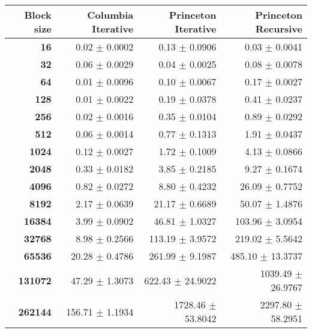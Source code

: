 \begin{tabular}{rrrr}\toprule
\textbf{Block size}  & \textbf{Columbia Iterative} & \textbf{Princeton Iterative} & \textbf{Princeton Recursive}\\\midrule
\textbf{16}  & 0.02 $\pm$ 0.0002 & 0.13 $\pm$ 0.0906 & 0.03 $\pm$ 0.0041\\
\textbf{32}  & 0.06 $\pm$ 0.0029 & 0.04 $\pm$ 0.0025 & 0.08 $\pm$ 0.0078\\
\textbf{64}  & 0.01 $\pm$ 0.0096 & 0.10 $\pm$ 0.0067 & 0.17 $\pm$ 0.0027\\
\textbf{128}  & 0.01 $\pm$ 0.0022 & 0.19 $\pm$ 0.0378 & 0.41 $\pm$ 0.0237\\
\textbf{256}  & 0.02 $\pm$ 0.0016 & 0.35 $\pm$ 0.0104 & 0.89 $\pm$ 0.0292\\
\textbf{512}  & 0.06 $\pm$ 0.0014 & 0.77 $\pm$ 0.1313 & 1.91 $\pm$ 0.0437\\
\textbf{1024}  & 0.12 $\pm$ 0.0027 & 1.72 $\pm$ 0.1009 & 4.13 $\pm$ 0.0866\\
\textbf{2048}  & 0.33 $\pm$ 0.0182 & 3.85 $\pm$ 0.2185 & 9.27 $\pm$ 0.1674\\
\textbf{4096}  & 0.82 $\pm$ 0.0272 & 8.80 $\pm$ 0.4232 & 26.09 $\pm$ 0.7752\\
\textbf{8192}  & 2.17 $\pm$ 0.0639 & 21.17 $\pm$ 0.6689 & 50.07 $\pm$ 1.4876\\
\textbf{16384}  & 3.99 $\pm$ 0.0902 & 46.81 $\pm$ 1.0327 & 103.96 $\pm$ 3.0954\\
\textbf{32768}  & 8.98 $\pm$ 0.2566 & 113.19 $\pm$ 3.9572 & 219.02 $\pm$ 5.5642\\
\textbf{65536}  & 20.28 $\pm$ 0.4786 & 261.99 $\pm$ 9.1987 & 485.10 $\pm$ 13.3737\\
\textbf{131072}  & 47.29 $\pm$ 1.3073 & 622.43 $\pm$ 24.9022 & 1039.49 $\pm$ 26.9767\\
\textbf{262144} & 156.71 $\pm$ 1.1934 & 1728.46 $\pm$ 53.8042 & 2297.80 $\pm$ 58.2951\\
\bottomrule
\end{tabular}
